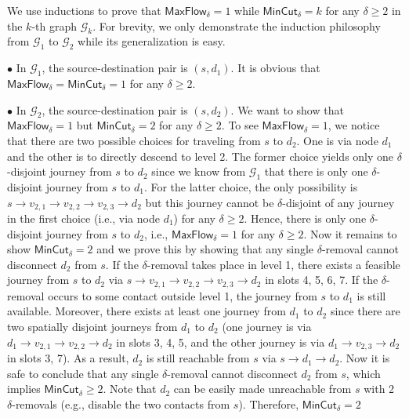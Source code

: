 \documentclass[10pt, conference, letterpaper]{IEEEtran}
\begin{document}
We use inductions to prove that $\mathsf{MaxFlow_{\delta}}=1$ while $\mathsf{MinCut_{\delta}}=k$ for any $\delta\ge 2$ in the $k$-th graph $\mathcal{G}_k$. For brevity, we only demonstrate the induction philosophy from  $\mathcal{G}_1$ to $\mathcal{G}_2$ while its generalization is easy.

\vspace{1mm}

\noindent $\bullet$ In $\mathcal{G}_1$, the source-destination pair is $(s,d_1)$. It is obvious that $\mathsf{MaxFlow_{\delta}}= \mathsf{MinCut_{\delta}}=1$ for any $\delta\ge 2$.

\vspace{1mm}

\noindent $\bullet$ In $\mathcal{G}_2$, the source-destination pair is $(s,d_2)$. We want to show that $\mathsf{MaxFlow_{\delta}}=1$ but $\mathsf{MinCut_{\delta}}=2$ for any $\delta\ge 2$. To see $\mathsf{MaxFlow_{\delta}}=1$, we notice that there are two possible choices for traveling from $s$ to $d_2$. One is via node $d_1$ and the other is to directly descend to level 2. The former choice yields only one $\delta$-disjoint journey from $s$ to $d_2$ since we know from $\mathcal{G}_1$ that there is only one $\delta$-disjoint journey from $s$ to $d_1$. For the latter choice, the only possibility is $s\rightarrow v_{2,1}\rightarrow v_{2,2}\rightarrow v_{2,3}\rightarrow d_2$ but this journey cannot be $\delta$-disjoint of any journey in the first choice (i.e., via node $d_1$) for any $\delta\ge 2$. Hence, there is only one $\delta$-disjoint journey from $s$ to $d_2$, i.e., $\mathsf{MaxFlow_{\delta}}=1$ for any $\delta\ge 2$. Now it remains to show $\mathsf{MinCut_{\delta}}=2$ and we prove this by showing that any single $\delta$-removal cannot disconnect $d_2$ from $s$. If the $\delta$-removal takes place in level 1, there exists a feasible journey from $s$ to $d_2$ via $s\rightarrow v_{2,1}\rightarrow v_{2,2}\rightarrow v_{2,3}\rightarrow d_2$ in slots 4, 5, 6, 7. If the $\delta$-removal occurs to some contact outside level 1, the journey from $s$ to $d_1$ is still available. Moreover, there exists at least one journey from $d_1$ to $d_2$ since there are two spatially disjoint journeys from $d_1$ to $d_2$ (one journey is via $d_1\rightarrow v_{2,1}\rightarrow v_{2,2}\rightarrow d_2$ in slots 3, 4, 5,  and the other journey is via $d_1\rightarrow v_{2,3}\rightarrow d_2$ in slots 3, 7). As a result, $d_2$ is still reachable from $s$ via $s\rightarrow d_1 \rightarrow d_2$. Now it is safe to conclude that any single $\delta$-removal cannot disconnect $d_2$ from $s$, which implies $\mathsf{MinCut_{\delta}} \ge 2$. Note that $d_2$ can be easily made unreachable from $s$ with 2 $\delta$-removals (e.g., disable the two contacts from $s$). Therefore, $\mathsf{MinCut_{\delta}} = 2$
\end{document}
